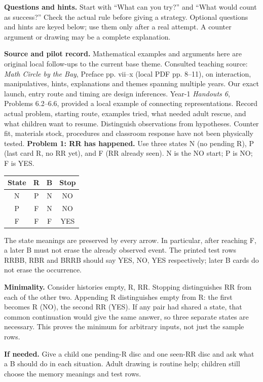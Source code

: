 \documentclass[11pt]{article}
\begin{document}
\textbf{Questions and hints.} Start with ``What can you try?'' and ``What would count as success?'' Check the actual rule before giving a strategy. Optional questions and hints are keyed below; use them only after a real attempt. A counter argument or drawing may be a complete explanation.

\textbf{Source and pilot record.} Mathematical examples and arguments here are original local follow-ups to the current base theme. Consulted teaching source: \emph{Math Circle by the Bay}, Preface pp. vii--x (local PDF pp. 8--11), on interaction, manipulatives, hints, explanations and themes spanning multiple years. Our exact launch, entry route and timing are design inferences. Year-1 \emph{Handouts 6}, Problems 6.2--6.6, provided a local example of connecting representations. Record actual problem, starting route, examples tried, what needed adult rescue, and what children want to resume. Distinguish observations from hypotheses. Counter fit, materials stock, procedures and classroom response have not been physically tested.
\newpage
\textbf{Problem 1: RR has happened.} Use three states N (no pending R), P (last card R, no RR yet), and F (RR already seen). N is the NO start; P is NO; F is YES.
\begin{center}\begin{tabular}{c|cc|c}
State&R&B&Stop\\\hline
N&P&N&NO\\
P&F&N&NO\\
F&F&F&YES
\end{tabular}\end{center}
The state meanings are preserved by every arrow. In particular, after reaching F, a later B must not erase the already observed event. The printed test rows RRBB, RBR and BRRB should say YES, NO, YES respectively; later B cards do not erase the occurrence.

\textbf{Minimality.} Consider histories empty, R, RR. Stopping distinguishes RR from each of the other two. Appending R distinguishes empty from R: the first becomes R (NO), the second RR (YES). If any pair had shared a state, that common continuation would give the same answer, so three separate states are necessary. This proves the minimum for arbitrary inputs, not just the sample rows.

\textbf{If needed.} Give a child one pending-R disc and one seen-RR disc and ask what a B should do in each situation. Adult drawing is routine help; children still choose the memory meanings and test rows.
\end{document}

